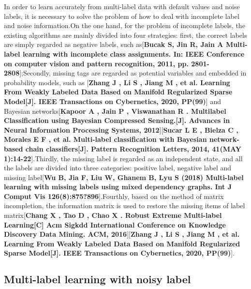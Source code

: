 \documentclass[final,3p,times]{elsarticle}
\begin{document}
In order to learn accurately from multi-label data with default values and noise labels, it is necessary to solve the problem of how to deal with incomplete label and noise information.On the one hand, for the problem of incomplete labels, the existing algorithms are mainly divided into four strategies: first, the correct labels are simply regarded as negative labels, such as[\textbf{Bucak S, Jin R, Jain A Multi-label learning with incomplete class assignments. In: IEEE Conference on computer vision and pattern recognition, 2011, pp. 2801-2808}];Secondly, missing tags are regarded as potential variables and embedded in probability models, such as [\textbf{Zhang J , Li S , Jiang M , et al. Learning From Weakly Labeled Data Based on Manifold Regularized Sparse Model[J]. IEEE Transactions on Cybernetics, 2020, PP(99)}] and Bayesian networks[\textbf{Kapoor A , Jain P , Viswanathan R . Multilabel Classification using Bayesian Compressed Sensing.[J]. Advances in Neural Information Processing Systems, 2012}][\textbf{Sucar L E , Bielza C , Morales E F , et al. Multi-label classification with Bayesian network-based chain classifiers[J]. Pattern Recognition Letters, 2014, 41(MAY 1):14-22}].Thirdly, the missing label is regarded as an independent state, and all the labels are divided into three categories: positive label, negative label and missing label[\textbf{Wu B, Jia F, Liu W, Ghanem B, Lyu S (2018) Multi-label learning with missing labels using mixed dependency graphs. Int J Comput Vis 126(8):875?896}].Fourthly, based on the method of matrix incompletion, the information matrix is used to restore the missing items of label matrix[\textbf{Chang X , Tao D , Chao X . Robust Extreme Multi-label Learning[C] Acm Sigkdd International Conference on Knowledge Discovery  Data Mining. ACM, 2016}][\textbf{Zhang J , Li S , Jiang M , et al. Learning From Weakly Labeled Data Based on Manifold Regularized Sparse Model[J]. IEEE Transactions on Cybernetics, 2020, PP(99)}].


\subsection{Multi-label learning with noisy label}
\end{document}
